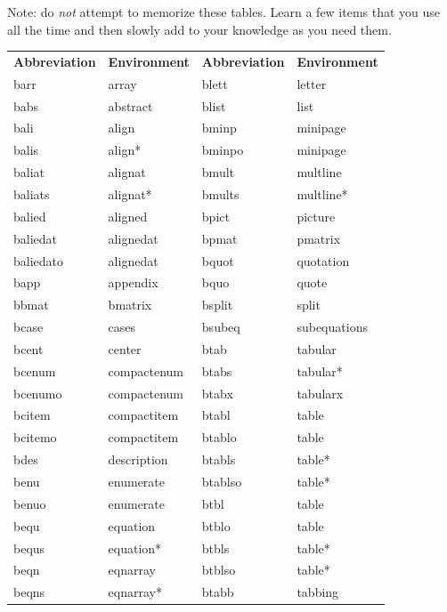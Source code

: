 \documentclass[letterpaper,11pt]{article}
\begin{document}
Note: do \emph{not} attempt to memorize these tables. Learn a few items that you use all the time and then slowly add to your knowledge as you need them.
\begin{table}[H]
\small
\centering
\begin{tabular}{llll}
\textbf{Abbreviation} & \textbf{Environment} & \textbf{Abbreviation} & \textbf{Environment} \\
\cmidrule[0.5pt](lr){1-1} \cmidrule[0.5pt](lr){2-2} \cmidrule[0.5pt](lr){3-3} \cmidrule[0.5pt](lr){4-4}
barr      & array       & blett   & letter \\
babs      & abstract    & blist   & list \\
bali      & align       & bminp   & minipage \\
balis     & align*      & bminpo  & minipage \\
baliat    & alignat     & bmult   & multline \\
baliats   & alignat*    & bmults  & multline* \\
balied    & aligned     & bpict   & picture \\
baliedat  & alignedat   & bpmat   & pmatrix \\
baliedato & alignedat   & bquot   & quotation \\
bapp      & appendix    & bquo    & quote \\
bbmat     & bmatrix     & bsplit  & split \\
bcase     & cases       & bsubeq  & subequations \\
bcent     & center      & btab    & tabular \\
bcenum    & compactenum & btabs   & tabular* \\
bcenumo   & compactenum & btabx   & tabularx \\
bcitem    & compactitem & btabl   & table \\
bcitemo   & compactitem & btablo  & table \\
bdes      & description & btabls  & table* \\
benu      & enumerate   & btablso & table* \\
benuo     & enumerate   & btbl    & table \\
bequ      & equation    & btblo   & table \\
bequs     & equation*   & btbls   & table* \\
beqn      & eqnarray    & btblso  & table* \\
beqns     & eqnarray*   & btabb   & tabbing \\

\end{tabular}
\end{table}
\end{document}
